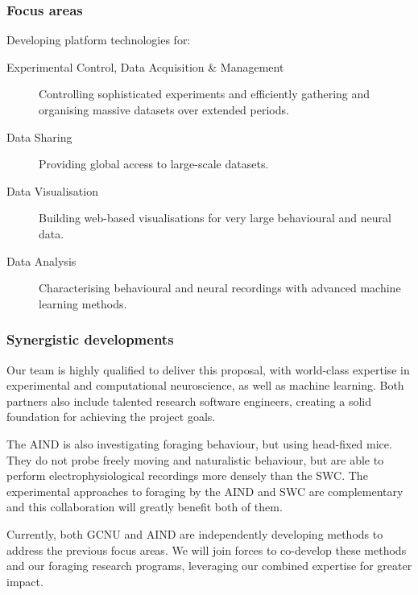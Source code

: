 
\subsubsection{Focus areas}

Developing platform technologies for:

\begin{description}

    \item[Experimental Control, Data Acquisition \& Management] Controlling
        sophisticated experiments and efficiently gathering and organising
        massive datasets over extended periods.

    \item[Data Sharing] Providing global access to large-scale datasets.

    \item[Data Visualisation] Building web-based visualisations for very large
        behavioural and neural data.

    \item[Data Analysis] Characterising behavioural and neural recordings with
        advanced machine learning methods.

\end{description}

\subsubsection{Synergistic developments}

Our team is highly qualified to deliver this proposal, with world-class
expertise in experimental and computational neuroscience, as well as machine
learning.
%
Both partners also include talented research software engineers, creating a
solid foundation for achieving the project goals.

%

The AIND is also investigating foraging behaviour, but using head-fixed mice.
They do not probe freely moving and naturalistic behaviour, but are able to
perform electrophysiological recordings more densely than the SWC.
%
The experimental approaches to foraging by the AIND and SWC are complementary
and this collaboration will greatly benefit both of them.

Currently, both GCNU and AIND are independently developing methods to address
the previous focus areas. We will join forces to co-develop these methods and
our foraging research programs, leveraging our combined expertise for greater
impact.
